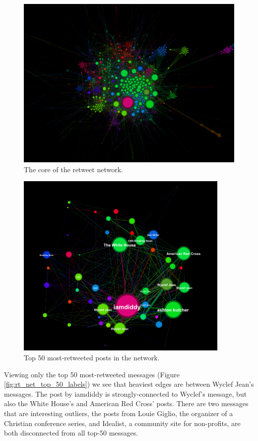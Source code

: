 \documentclass[a4paper, 11pt, titlepage]{article}
\begin{document}
\begin{figure}[h]
\centering
\includegraphics[width=120mm]{../figures/rt_net_core}
\caption{The core of the retweet network.}
\label{fig:rt_net_core}
\end{figure}

\begin{figure}[h]
\centering
\includegraphics[height=90mm]{../figures/rt_net_top_50_labels}
\caption{Top 50 most-retweeted posts in the network.}
\label{fig:rt_net_top_50}
\end{figure}

Viewing only the top 50 most-retweeted messages (Figure \ref{fig:rt_net_top_50_labels}) we see that heaviest edges are between Wyclef Jean's messages.  The post by iamdiddy is strongly-connected to Wyclef's message, but also the White House's and American Red Cross' posts.  There are two messages that are interesting outliers, the posts from Louie Giglio, the organizer of a Christian conference series, and Idealist, a community site for non-profits, are both disconnected from all top-50 messages.
\end{document}
